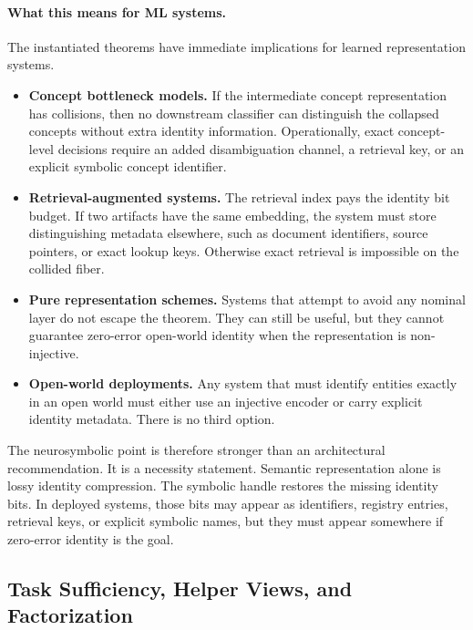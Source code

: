 \paragraph{What this means for ML systems.}
The instantiated theorems have immediate implications for learned representation systems.

\begin{itemize}
\item \textbf{Concept bottleneck models.} If the intermediate concept representation has collisions, then no downstream classifier can distinguish the collapsed concepts without extra identity information. Operationally, exact concept-level decisions require an added disambiguation channel, a retrieval key, or an explicit symbolic concept identifier.

\item \textbf{Retrieval-augmented systems.} The retrieval index pays the identity bit budget. If two artifacts have the same embedding, the system must store distinguishing metadata elsewhere, such as document identifiers, source pointers, or exact lookup keys. Otherwise exact retrieval is impossible on the collided fiber.

\item \textbf{Pure representation schemes.} Systems that attempt to avoid any nominal layer do not escape the theorem. They can still be useful, but they cannot guarantee zero-error open-world identity when the representation is non-injective.

\item \textbf{Open-world deployments.} Any system that must identify entities exactly in an open world must either use an injective encoder or carry explicit identity metadata. There is no third option.
\end{itemize}

The neurosymbolic point is therefore stronger than an architectural recommendation. It is a necessity statement. Semantic representation alone is lossy identity compression. The symbolic handle restores the missing identity bits. In deployed systems, those bits may appear as identifiers, registry entries, retrieval keys, or explicit symbolic names, but they must appear somewhere if zero-error identity is the goal.

\subsection{Task Sufficiency, Helper Views, and Factorization}

